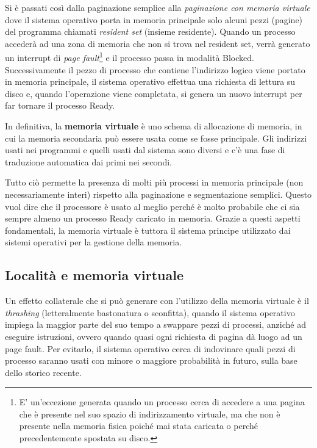 Si è passati così dalla paginazione semplice alla \textit{paginazione con memoria virtuale} dove il sistema operativo porta in memoria principale solo alcuni pezzi (pagine) del programma chiamati \textit{resident set} (insieme residente). Quando un processo accederà ad una zona di memoria che non si trova nel resident set, verrà generato un interrupt di \textit{page fault}\footnote{E' un'eccezione generata quando un processo cerca di accedere a una pagina che è presente nel suo spazio di indirizzamento virtuale, ma che non è presente nella memoria fisica poiché mai stata caricata o perché precedentemente spostata su disco.} e il processo passa in modalità Blocked. Successivamente il pezzo di processo che contiene l'indirizzo logico viene portato in memoria principale, il sistema operativo effettua una richiesta di lettura su disco e, quando l'operazione viene completata, si genera un nuovo interrupt per far tornare il processo Ready.

\begin{redbar}
    In definitiva, la \textbf{memoria virtuale} è uno schema di allocazione di memoria, in cui la memoria secondaria può essere usata come se fosse principale. Gli indirizzi usati nei programmi e quelli usati dal sistema sono diversi e c'è una fase di traduzione automatica dai primi nei secondi.
\end{redbar}

Tutto ciò permette la presenza di molti più processi in memoria principale (non necessariamente interi) rispetto alla paginazione e segmentazione semplici. Questo vuol dire che il processore è usato al meglio perché è molto probabile che ci sia sempre almeno un processo Ready caricato in memoria. Grazie a questi aspetti fondamentali, la memoria virtuale è tuttora il sistema principe utilizzato dai sistemi operativi per la gestione della memoria.

\subsection*{Località e memoria virtuale}
Un effetto collaterale che si può generare con l'utilizzo della memoria virtuale è il \textit{thrashing} (letteralmente bastonatura o sconfitta), quando il sistema operativo impiega la maggior parte del suo tempo a swappare pezzi di processi, anziché ad eseguire istruzioni, ovvero quando quasi ogni richiesta di pagina dà luogo ad un page fault. Per evitarlo, il sistema operativo cerca di indovinare quali pezzi di processo saranno usati con minore o maggiore probabilità in futuro, sulla base dello storico recente.

